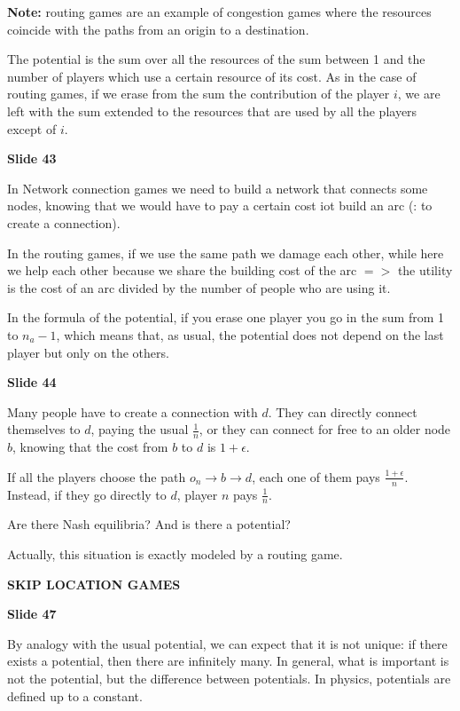 \noindent \textbf{Note:} routing games are an example of congestion games 
where the resources coincide with the paths from an origin to a destination.

\noindent The potential is the sum over all the resources of the sum between 
1 and the number of players which use a certain resource of its cost. As in 
the case of routing games, if we erase from the sum the contribution of the 
player $i$, we are left with the sum extended to the resources that are used 
by all the players except of $i$.

\bigskip
\noindent \textbf{Slide 43}

\noindent In Network connection games we need to build a network that connects 
some nodes, knowing that we would have to pay a certain cost iot build an 
arc (: to create a connection).

\noindent In the routing games, if we use the same path we damage each other, 
while here we help each other because we share the building cost of the 
arc $=>$ the utility is the cost of an arc divided by the number of people 
who are using it.

\noindent In the formula of the potential, if you erase one player you go in 
the sum from 1 to $n_a-1$, which means that, as usual, the potential does not 
depend on the last player but only on the others.

\bigskip
\noindent \textbf{Slide 44}

\noindent Many people have to create a connection with $d$. They can directly 
connect themselves to $d$, paying the usual $\frac{1}{n}$, or they can connect 
for free to an older node $b$, knowing that the cost from $b$ to $d$ is 
$1+\epsilon$.

\noindent If all the players choose the path $o_n \rightarrow b \rightarrow 
d$, each one of them pays $\frac{1+\epsilon}{n}$. Instead, if they go directly 
to $d$, player $n$ pays $\frac{1}{n}$.

\noindent Are there Nash equilibria? And is there a potential?

\noindent Actually, this situation is exactly modeled by a routing game.

\bigskip
\noindent \textbf{SKIP LOCATION GAMES}

\bigskip
\noindent \textbf{Slide 47}

\noindent By analogy with the usual potential, we can expect that it is 
not unique: if there exists a potential, then there are infinitely many. 
In general, what is important is not the potential, but the difference 
between potentials. In physics, potentials are defined up to a constant.

